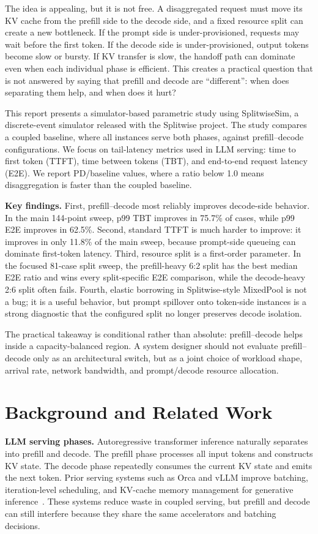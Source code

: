 \documentclass[10pt]{article}
\newcommand{\pd}{prefill--decode}
\newcommand{\pdratio}{PD/baseline}
\begin{document}
The idea is appealing, but it is not free. A disaggregated request must move its KV cache from the prefill side to the decode side, and a fixed resource split can create a new bottleneck. If the prompt side is under-provisioned, requests may wait before the first token. If the decode side is under-provisioned, output tokens become slow or bursty. If KV transfer is slow, the handoff path can dominate even when each individual phase is efficient. This creates a practical question that is not answered by saying that prefill and decode are ``different'': when does separating them help, and when does it hurt?

This report presents a simulator-based parametric study using SplitwiseSim, a discrete-event simulator released with the Splitwise project. The study compares a coupled baseline, where all instances serve both phases, against \pd{} configurations. We focus on tail-latency metrics used in LLM serving: time to first token (TTFT), time between tokens (TBT), and end-to-end request latency (E2E). We report \pdratio{} values, where a ratio below 1.0 means disaggregation is faster than the coupled baseline.

\textbf{Key findings.} First, \pd{} most reliably improves decode-side behavior. In the main 144-point sweep, p99 TBT improves in 75.7\% of cases, while p99 E2E improves in 62.5\%. Second, standard TTFT is much harder to improve: it improves in only 11.8\% of the main sweep, because prompt-side queueing can dominate first-token latency. Third, resource split is a first-order parameter. In the focused 81-case split sweep, the prefill-heavy 6:2 split has the best median E2E ratio and wins every split-specific E2E comparison, while the decode-heavy 2:6 split often fails. Fourth, elastic borrowing in Splitwise-style MixedPool is not a bug; it is a useful behavior, but prompt spillover onto token-side instances is a strong diagnostic that the configured split no longer preserves decode isolation.

The practical takeaway is conditional rather than absolute: \pd{} helps inside a capacity-balanced region. A system designer should not evaluate \pd{} only as an architectural switch, but as a joint choice of workload shape, arrival rate, network bandwidth, and prompt/decode resource allocation.

\section{Background and Related Work}
\textbf{LLM serving phases.} Autoregressive transformer inference naturally separates into prefill and decode. The prefill phase processes all input tokens and constructs KV state. The decode phase repeatedly consumes the current KV state and emits the next token. Prior serving systems such as Orca and vLLM improve batching, iteration-level scheduling, and KV-cache memory management for generative inference~\citep{orca2022,vllm2023}. These systems reduce waste in coupled serving, but prefill and decode can still interfere because they share the same accelerators and batching decisions.
\end{document}
